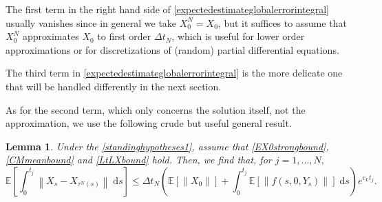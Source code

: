 \documentclass[reqno,12pt]{amsart}
\theoremstyle{plain} %
\newtheorem{lemma}{Lemma}[section]
\theoremstyle{definition} %
\begin{document}
The first term in the right hand side of \cref{expectedestimateglobalerrorintegral} usually vanishes since in general we take $X_0^N = X_0$, but it suffices to assume that $X_0^N$ approximates $X_0$ to first order $\Delta t_N$, which is useful for lower order approximations or for discretizations of (random) partial differential equations.

The third term in \cref{expectedestimateglobalerrorintegral} is the more delicate one that will be handled differently in the next section.

As for the second term, which only concerns the solution itself, not the approximation, we use the following crude but useful general result.

\begin{lemma}
    Under the \cref{standinghypotheses1}, assume that \cref{EX0strongbound}, \cref{CMmeanbound} and \cref{LtLXbound} hold. Then, we find that, for $j=1, \ldots, N,$
    \begin{equation}
        \label{estimatesecondterminglobalstrongerrorintegral}
        \mathbb{E}\left[\int_0^{t_j}\left\|X_s - X_{\tau^N(s)}\right\| \;\mathrm{d}s\right] \leq \Delta t_N \left(\mathbb{E}[\|X_0\|] + \int_0^{t_j} \mathbb{E}[\|f(s, 0, Y_s)\|]\;\mathrm{d}s\right) e^{c_L t_j}.
    \end{equation}
\end{lemma}
\end{document}
